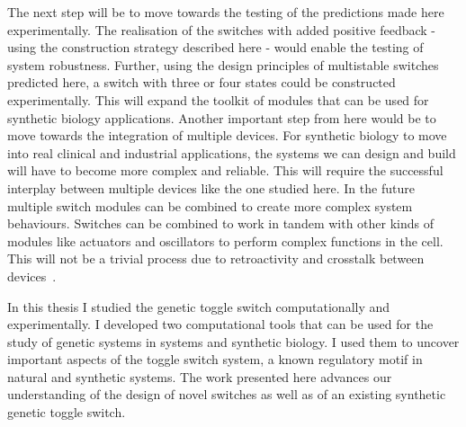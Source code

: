 The next step will be to move towards the testing of the predictions made here experimentally. The realisation of the switches with added positive feedback - using the construction strategy described here - would enable the testing of system robustness. Further, using the design principles of multistable switches predicted here, a switch with three or four states could be constructed experimentally. This will expand the toolkit of modules that can be used for synthetic biology applications. Another important step from here would be to move towards the integration of multiple devices. For synthetic biology to move into real clinical and industrial applications, the systems we can design and build will have to become more complex and reliable. This will require the successful interplay between multiple devices like the one studied here. In the future multiple switch modules can be combined to create more complex system behaviours. Switches can be combined to work in tandem with other kinds of modules like actuators and oscillators to perform complex functions in the cell. This will not be a trivial process due to retroactivity and crosstalk between devices~\autocite{DelVecchio:2008gy}.


In this thesis I studied the genetic toggle switch computationally and experimentally. I developed two computational tools that can be used for the study of genetic systems in systems and synthetic biology. I used them to uncover important aspects of the toggle switch system, a known regulatory motif in natural and synthetic systems. The work presented here advances our understanding of the design of novel switches as well as of an existing synthetic genetic toggle switch.



